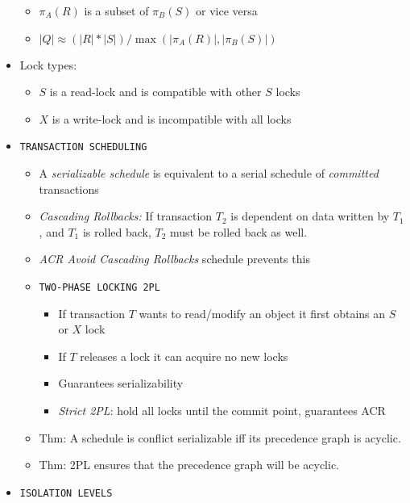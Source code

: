 \documentclass[landscape,8pt]{extarticle}
\newcommand{\code}{\lstinline}
\begin{document}
\begin{multicols}{5}
\begin{itemize}
\begin{itemize}
                  \item $\pi_A (R)$ is a subset of $\pi_B (S)$ or vice versa
                  \item $|Q| \approx (|R| * |S|) / \max{(|\pi_A(R)|, |\pi_B(S)|)}$
              \end{itemize}
        \item Lock types:
              \begin{itemize}
                  \item $S$ is a read-lock and is compatible with other $S$ locks
                  \item $X$ is a write-lock and is incompatible with all locks
              \end{itemize}
        \item \code{TRANSACTION SCHEDULING}
              \begin{itemize}
                  \item A \emph{serializable schedule} is equivalent to a serial schedule of \emph{committed} transactions
                  \item \emph{Cascading Rollbacks:} If transaction $T_2$ is dependent on data written by $T_1$, and $T_1$ is rolled back, $T_2$ must be rolled back as well.
                  \item \emph{ACR Avoid Cascading Rollbacks} schedule prevents this
                  \item \code{TWO-PHASE LOCKING 2PL}
                        \begin{itemize}
                            \item If transaction $T$ wants to read/modify an object it first obtains an $S$ or $X$ lock
                            \item If $T$ releases a lock it can acquire no new locks
                            \item Guarantees serializability
                            \item \emph{Strict 2PL}: hold all locks until the commit point, guarantees ACR
                        \end{itemize}
                  \item Thm: A schedule is conflict serializable iff its precedence graph is acyclic.
                  \item Thm: 2PL ensures that the precedence graph will be acyclic.
              \end{itemize}
        \item \code{ISOLATION LEVELS}

\end{itemize}
\end{multicols}
\end{document}
